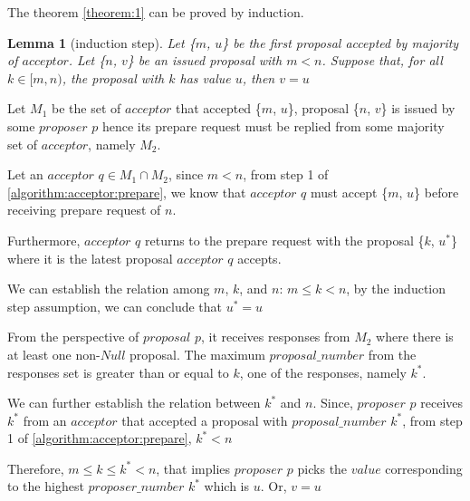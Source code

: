 \documentclass{article}
\newtheorem{lemma}{Lemma}
\begin{document}
    The theorem \ref{theorem:1} can be proved by induction.
    
    \begin{lemma}[induction step]
    Let \{$m$, $u$\} be the first proposal accepted by majority of $acceptor$.
    Let \{$n$, $v$\} be an issued proposal with $m < n$.
    Suppose that, for all $k \in [m, n)$, the proposal with $k$ has value $u$, then $v = u$
    \end{lemma}
    
    Let $M_1$ be the set of $acceptor$ that accepted \{$m$, $u$\}, proposal \{$n$, $v$\} is issued by some $proposer$ $p$ hence its prepare request must be replied from some majority set of $acceptor$, namely $M_2$.
    
    Let an $acceptor$ $q \in M_1 \cap M_2$, since $m < n$, from step 1 of \ref{algorithm:acceptor:prepare}, we know that $acceptor$ $q$ must accept \{$m$, $u$\} before receiving prepare request of $n$.
    
    Furthermore, $acceptor$ $q$ returns to the prepare request with the proposal \{$k$, $u^*$\} where it is the latest proposal $acceptor$ $q$ accepts.
    
    We can establish the relation among $m$, $k$, and $n$: $m \leq k < n$, by the induction step assumption, we can conclude that $u^* = u$
    
    From the perspective of $proposal$ $p$, it receives responses from $M_2$ where there is at least one non-$Null$ proposal. The maximum $proposal\_number$ from the responses set is greater than or equal to $k$, one of the responses, namely $k^*$.
    
    We can further establish the relation between $k^*$ and $n$. Since, $proposer$ $p$ receives $k^*$ from an $acceptor$ that accepted a proposal with $proposal\_number$ $k^*$, from step 1 of \ref{algorithm:acceptor:prepare}, $k^* < n$
    
    Therefore, $m \leq k \leq k^* < n$, that implies $proposer$ $p$ picks the $value$ corresponding to the highest $proposer\_number$ $k^*$ which is $u$. Or, $v = u$



\end{document}
